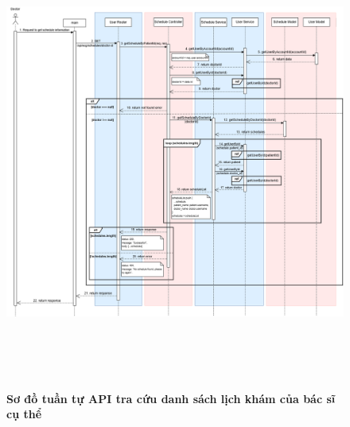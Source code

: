 \begin{figure}[H]
	\centering
	\includegraphics[width=15cm,height=15cm]{Images/api_sequence/schedule/getScheduleByDoctorId.drawio.png}
	\caption[Sơ đồ tuần tự API tra cứu danh sách lịch khám của bác sĩ cụ thể]{\bfseries \fontsize{12pt}{0pt}\selectfont Sơ đồ tuần tự API tra cứu danh sách lịch khám của bác sĩ cụ thể}
	\label{sequence_diagram_get_schedule_by_doctor}
\end{figure}

